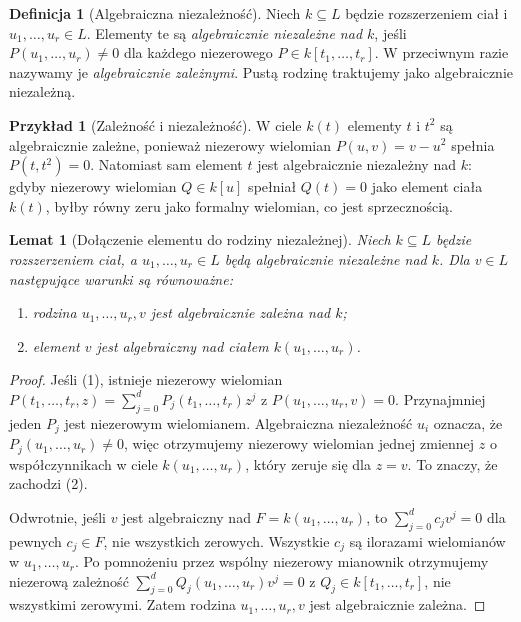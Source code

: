 \documentclass[11pt,a4paper,openany]{report}
\numberwithin{equation}{section}
\theoremstyle{plain}
\newtheorem{lemat}[twierdzenie]{Lemat}
\theoremstyle{definition}
\newtheorem{definicja}[twierdzenie]{Definicja}
\newtheorem{przyklad}[twierdzenie]{Przykład}
\theoremstyle{remark}
\begin{document}
\begin{definicja}[Algebraiczna niezależność]
Niech $k\subseteq L$ będzie rozszerzeniem ciał i
$u_1,\dots,u_r\in L$. Elementy te są
\emph{algebraicznie niezależne nad $k$}, jeśli
$P(u_1,\dots,u_r)\ne0$ dla każdego niezerowego
$P\in k[t_1,\dots,t_r]$. W przeciwnym razie
nazywamy je \emph{algebraicznie zależnymi}.
Pustą rodzinę traktujemy jako algebraicznie niezależną.
\end{definicja}

\begin{przyklad}[Zależność i niezależność]
W ciele $k(t)$ elementy $t$ i $t^2$ są algebraicznie zależne,
ponieważ niezerowy wielomian $P(u,v)=v-u^2$ spełnia
$P(t,t^2)=0$. Natomiast sam element $t$ jest algebraicznie
niezależny nad $k$: gdyby niezerowy wielomian $Q\in k[u]$
spełniał $Q(t)=0$ jako element ciała $k(t)$,
byłby równy zeru jako formalny wielomian, co jest sprzecznością.
\end{przyklad}

\begin{lemat}[Dołączenie elementu do rodziny niezależnej]
\label{lem:independence-algebraic}
Niech $k\subseteq L$ będzie rozszerzeniem ciał,
a $u_1,\dots,u_r\in L$ będą algebraicznie niezależne nad $k$.
Dla $v\in L$ następujące warunki są równoważne:
\begin{enumerate}[label=\arabic*)]
\item rodzina $u_1,\dots,u_r,v$ jest algebraicznie zależna nad $k$;
\item element $v$ jest algebraiczny nad ciałem $k(u_1,\dots,u_r)$.
\end{enumerate}
\end{lemat}
\begin{proof}
Jeśli (1), istnieje niezerowy wielomian
$P(t_1,\dots,t_r,z)=\sum_{j=0}^d P_j(t_1,\dots,t_r)z^j$
z $P(u_1,\dots,u_r,v)=0$.
Przynajmniej jeden $P_j$ jest niezerowym wielomianem.
Algebraiczna niezależność $u_i$ oznacza, że
$P_j(u_1,\dots,u_r)\ne0$, więc otrzymujemy
niezerowy wielomian jednej zmiennej $z$ o współczynnikach
w ciele $k(u_1,\dots,u_r)$, który zeruje się dla $z=v$.
To znaczy, że zachodzi (2).

Odwrotnie, jeśli $v$ jest algebraiczny nad
$F=k(u_1,\dots,u_r)$, to
$\sum_{j=0}^d c_j v^j=0$ dla pewnych $c_j\in F$,
nie wszystkich zerowych. Wszystkie $c_j$ są ilorazami
wielomianów w $u_1,\dots,u_r$. Po pomnożeniu przez wspólny
niezerowy mianownik otrzymujemy niezerową zależność
$\sum_{j=0}^d Q_j(u_1,\dots,u_r)v^j=0$
z $Q_j\in k[t_1,\dots,t_r]$, nie wszystkimi zerowymi.
Zatem rodzina $u_1,\dots,u_r,v$ jest algebraicznie zależna.
\end{proof}
\end{document}
